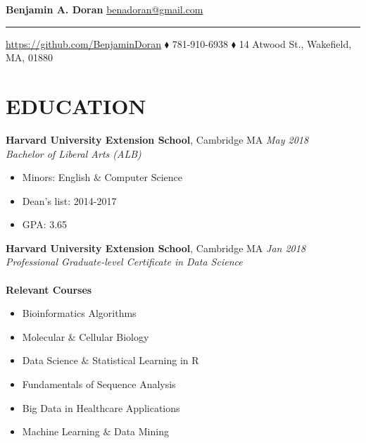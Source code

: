 \documentclass[hidelinks, 11pt]{article}
\begin{document}
\newcommand{\sectiontext}[1]{\bf\color{sectioncolor}#1}
\newcommand{\titletext}[1]{{\large\bf #1}}
\newcommand{\experiencetitle}[4]{
\titletext{#1}, {#2}  \hspace*{\fill} \emph{#3} \\ 
\emph{#4}\vspace{-6pt}
}

\begin{center}
{\huge\bf Benjamin A. Doran} \hspace*{\fill}  
{\color{blue} \href{mailto://benadoran@gmail.com}{\large benadoran@gmail.com}}
\hrule
\vspace{6pt}
{\color{blue}\url{https://github.com/BenjaminDoran}} $\blacklozenge$ 781-910-6938 $\blacklozenge$ 14 Atwood St., Wakefield, MA, 01880
\end{center}
\vspace{-6pt}


\section*{\sectiontext{EDUCATION}}
\begin{addmargin}{.5in}

  \experiencetitle{Harvard University Extension School}{Cambridge MA}{May 2018}{Bachelor of Liberal Arts (ALB)}
  \begin{itemize}\setlength\itemsep{-4pt}
    \item{Minors: English $\&$ Computer Science}
    \item{Dean's list: 2014-2017}
    \item{GPA: 3.65}
  \end{itemize}
  \experiencetitle{Harvard University Extension School}{Cambridge MA}{Jan 2018}{Professional Graduate-level Certificate in Data Science} \\ \\
  \titletext{Relevant Courses}
  \vspace{-9pt}
  \begin{multicols}{2}
    \begin{itemize}\setlength\itemsep{-4pt}
      \item{Bioinformatics Algorithms}
      \item{Molecular $\&$ Cellular Biology}
      \item{Data Science $\&$ Statistical Learning in R}
      \item{Fundamentals of Sequence Analysis}
      \item{Big Data in Healthcare Applications}
      \item{Machine Learning $\&$ Data Mining}
    \end{itemize}
  \end{multicols}
\end{addmargin}
\vspace{-6pt}
\end{document}
